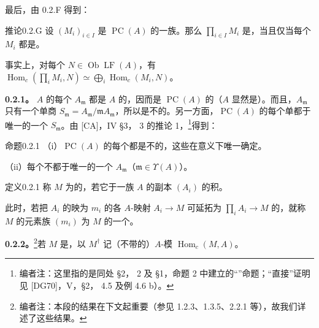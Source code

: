 最后，由 0.2.F 得到：
\begin{SGAresult}{推论}{0.2.G}
设 $(M_i)_{i\in I}$ 是 $\operatorname{PC}(A)$ 的一族。那么 $\prod_{i\in I}M_i$ 是，当且仅当每个 $M_i$ 都是。
\end{SGAresult}
事实上，对每个 $N\in\operatorname{Ob}\operatorname{LF}(A)$，有 $\operatorname{Hom}_c(\prod_iM_i,N)\simeq\bigoplus_i\operatorname{Hom}_c(M_i,N)$。

\textbf{0.2.1。} $A$ 的每个 $A_{\mathfrak m}$ 都是 $A$ 的，因而是 $\operatorname{PC}(A)$ 的（$A$ 显然是）。而且，$A_{\mathfrak m}$ 只有一个单商 $S_{\mathfrak m}=A_{\mathfrak m}/\mathfrak mA_{\mathfrak m}$，所以是不的。另一方面，$\operatorname{PC}(A)$ 的每个单都于唯一的一个 $S_{\mathfrak m}$。由 [CA]，IV \S 3， 3 的推论 1，\footnote{编者注：这里指的是同处 \S 2， 2 及 \S 1，命题 2 中建立的“”命题；“直接”证明见 [DG70]，V，\S 2， 4.5 及例 4.6 b）。}得到：
\begin{SGAresult}{命题}{0.2.1}
（i）$\operatorname{PC}(A)$ 的每个都是不的，这些在意义下唯一确定。

（ii）每个不都于唯一的一个 $A_{\mathfrak m}$（$\mathfrak m\in\Upsilon(A)$）。
\end{SGAresult}
\begin{SGAresult}{定义}{0.2.1}
称 $M$ 为的，若它于一族 $A$ 的副本 $(A_i)$ 的积。

此时，若把 $A_i$ 的映为 $m_i$ 的各 $A$-映射 $A_i\to M$ 可延拓为 $\prod_iA_i\to M$ 的，就称 $M$ 的元素族 $(m_i)$ 为 $M$ 的一个。
\end{SGAresult}

\textbf{0.2.2。}\footnote{编者注：本段的结果在下文起重要（参见 1.2.3、1.3.5、2.2.1 等），故我们详述了这些结果。}若 $M$ 是，以 $M^\dagger$ 记（不带的）$A$-模 $\operatorname{Hom}_c(M,A)$。

